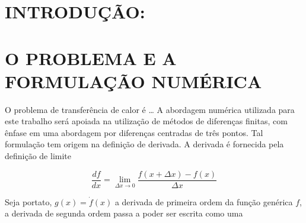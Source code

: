 \documentclass[a4paper, 12pt]{article}
\begin{document}
\vspace{0.5cm}

\section{INTRODUÇÃO:}

\section{O PROBLEMA E A FORMULAÇÃO NUMÉRICA}

O problema de transferência de calor é \ldots\newline
A abordagem numérica utilizada para este trabalho será apoiada na utilização de métodos de diferenças finitas, com ênfase em uma abordagem por diferenças centradas de três pontos. Tal formulação tem
origem na definição de derivada. A derivada é fornecida pela definição de limite \newline

\begin{equation}
  \frac{df}{dx} = \lim_{\Delta x \to 0} \frac{f(x + \Delta x) - f(x)}{\Delta x}
\end{equation}

Seja portato, $g(x) =  \dot{f}(x)$ a derivada de primeira ordem da função genérica $f$, a derivada de segunda ordem passa a poder ser escrita como uma 
% 
% 
% 
\end{document}
